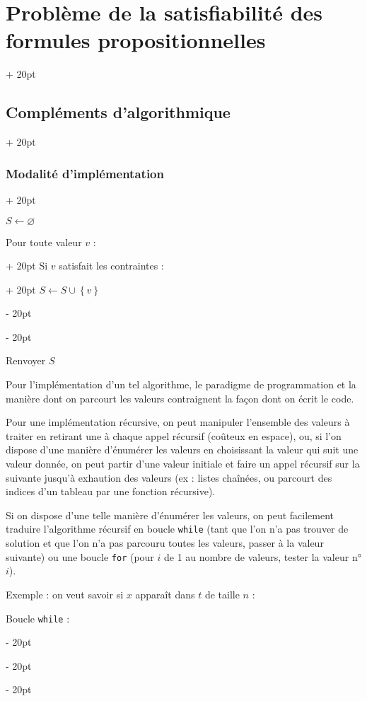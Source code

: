 \documentclass[a4paper, 12pt, twoside]{article}
\newcommand{\set}[1]{\left\{ #1 \right\}}
\newcommand{\ind}[1][20pt]{\advance\leftskip + #1}
\newcommand{\deind}[1][20pt]{\advance\leftskip - #1}
\newenvironment{indt}[2][20pt]{#2 \par \ind[#1]}{\par \deind} %
\begin{document}
\begin{indt}{\section{Problème de la satisfiabilité des formules propositionnelles}}
\begin{indt}{\subsection{Compléments d'algorithmique}}
\begin{indt}{\subsubsection{Modalité d'implémentation}}
                \begin{pseudocode}
                    $S \leftarrow \varnothing$
                    
                    \begin{indt}{Pour toute valeur $v$ :}
                        \begin{indt}{Si $v$ satisfait les contraintes :}
                            $S \leftarrow S \cup \set v$
                        \end{indt}
                    \end{indt}
                    
                    Renvoyer $S$
                \end{pseudocode}
                
                \vspace{12pt}
                
                Pour l'implémentation d'un tel algorithme, le paradigme de programmation et la manière dont on parcourt les valeurs contraignent la façon dont on écrit le code.
                
                \vspace{12pt}
                
                Pour une implémentation récursive, on peut manipuler l'ensemble des valeurs à traiter en retirant une à chaque appel récursif (coûteux en espace), ou, si l'on dispose d'une manière d'énumérer les valeurs en choisissant la valeur qui suit une valeur donnée, on peut partir d'une valeur initiale et faire un appel récursif sur la suivante jusqu'à exhaution des valeurs (ex : listes chaînées, ou parcourt des indices d'un tableau par une fonction récursive).
                
                Si on dispose d'une telle manière d'énumérer les valeurs, on peut facilement traduire l'algorithme récursif en boucle \texttt{while} (tant que l'on n'a pas trouver de solution et que l'on n'a pas parcouru toutes les valeurs, passer à la valeur suivante) ou une boucle \texttt{for} (pour $i$ de 1 au nombre de valeurs, tester la valeur n°$i$).
                
                \vspace{12pt}
                
                Exemple : on veut savoir si $x$ apparaît dans $t$ de taille $n$ :
                
                Boucle \texttt{while} :
                

\end{indt}
\end{indt}
\end{indt}
\end{document}
